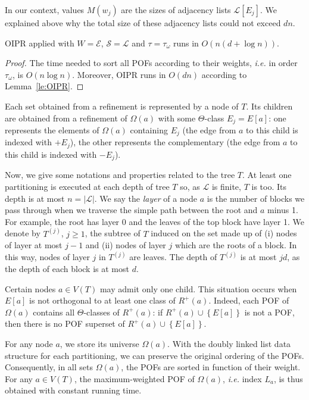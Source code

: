 \documentclass[a4paper,UKenglish,numberwithinsect,cleveref, autoref]{lipics-v2021}
\newcommand{\set}[1]{\left\{ #1 \right\}}
\newcommand{\card}[1]{\left| #1 \right|}
\begin{document}
In our context, values $M(w_j)$ are the sizes of adjacency lists $\mathcal{L}\left[E_j\right]$. We explained above why the total size of these adjacency lists could not exceed $dn$.

\begin{corollary} OIPR applied with $W = \mathcal{E}$, $\mathcal{S} = \mathcal{L}$ and $\tau = \tau_{\omega}$ runs in $O(n(d+\log n))$.
\label{co:oipr}
\end{corollary}
\begin{proof}
The time needed to sort all POFs according to their weights, {\em i.e.} in order $\tau_{\omega}$, is $O(n\log n)$. Moreover, OIPR runs in $O(dn)$  according to Lemma~\ref{le:OIPR}.
\end{proof}

Each set obtained from a refinement is represented by a node of $T$. Its children are obtained from a refinement of $\Omega(a)$ with some $\Theta$-class $E_j=E\left[a\right]$: one represents the elements of $\Omega(a)$ containing $E_j$ (the edge from $a$ to this child is indexed with $+E_j$), the other represents the complementary (the edge from $a$ to this child is indexed with $-E_j$).

Now, we give some notations and properties related to the tree $T$. At least one partitioning is executed at each depth of tree $T$ so, as $\mathcal{L}$ is finite, $T$ is too. Its depth is at most $n = \card{\mathcal{L}}$. 
We say the \textit{layer} of a node $a$ is the number of blocks we pass through when we traverse the simple path between the root and $a$ minus 1. For example, the root has layer 0 and the leaves of the top block have layer 1. We denote by $T^{(j)}$, $j\ge 1$, the subtree of $T$ induced on the set made up of (i) nodes of layer at most $j-1$ and (ii) nodes of layer $j$ which are the roots of a block. In this way, nodes of layer $j$ in $T^{(j)}$ are leaves. The depth of $T^{(j)}$ is at most $jd$, as the depth of each block is at most $d$. 

Certain nodes $a \in V(T)$ may admit only one child. This situation occurs when $E\left[a\right]$ is not orthogonal to at least one class of $R^+(a)$. Indeed, each POF of $\Omega(a)$ contains all $\Theta$-classes of $R^+(a)$: if $R^+(a) \cup \set{E\left[a\right]}$ is not a POF, then there is no POF superset of $R^+(a) \cup \set{E\left[a\right]}$. 

For any node $a$, we store its universe $\Omega(a)$. With the doubly linked list data structure for each partitioning, we can preserve the original ordering of the POFs. Consequently, in all sets $\Omega(a)$, the POFs are sorted in function of their weight. For any $a \in V(T)$, the maximum-weighted POF of $\Omega(a)$, {\em i.e.} index $L_a$, is thus obtained with constant running time.
\end{document}
